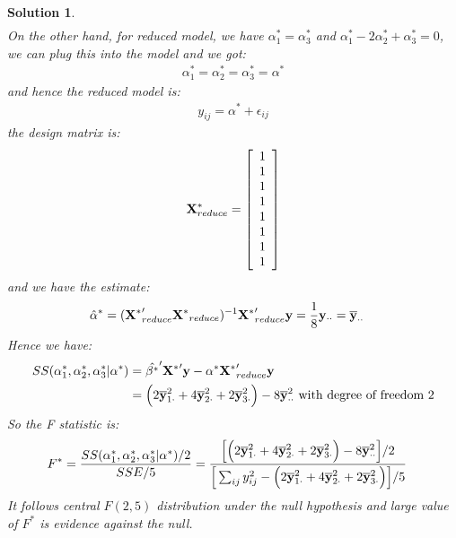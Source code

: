 \documentclass[11pt]{article}
\newtheorem{sol}{Solution}
\begin{document}
\begin{sol}
\begin{align*}
	\end{align*}
	On the other hand, for reduced model, we have $\alpha_1^{\ast} = \alpha_3^{\ast}$ and $\alpha_1^{\ast} - 2\alpha_2^{\ast} + \alpha_3^{\ast} = 0$, we can plug this into the model and we got:
	\begin{align*}
		\alpha_1^{\ast} = \alpha_2^{\ast} = \alpha_3^{\ast} = \alpha^{\ast}
	\end{align*}
	and hence the reduced model is:
	\begin{align*}
		y_{ij}  = \alpha^{\ast} + \epsilon_{ij}
	\end{align*}
	the design matrix is:
	\begin{align*}
		{\bf X}_{reduce}^{\ast} = \left[\begin{array}{c} 1\\ 1\\ 1\\ 1\\ 1\\ 1\\ 1\\ 1\end{array}\right]
	\end{align*}
	and we have the estimate:
	\begin{align*}
		\hat{\alpha}^{\ast} &= ({\bf X^{\ast}}_{reduce}'{\bf X^{\ast}}_{reduce})^{-1}{\bf X^{\ast}}_{reduce}'{\bf y} = \frac{1}{8}{\bf y}_{\cdot\cdot} = \overline{{\bf y}}_{\cdot\cdot}
	\end{align*}
	Hence we have:
	\begin{align*}
		SS(\alpha_1^{\ast}, \alpha_2^{\ast}, \alpha_3^{\ast}|\alpha^{\ast}) &= \hat{\beta^{\ast}}'{\bf X^{\ast}}'{\bf y}  - \alpha^{\ast}{\bf X^{\ast}}'_{reduce}{\bf y}\\
		&= \Big(2 \overline{{\bf y}}_{1\cdot}^2 + 4 \overline{{\bf y}}_{2\cdot}^2 + 2\overline{{\bf y}}_{3\cdot}^2\Big) - 8\overline{{\bf y}}_{\cdot\cdot}^2 \text{ with degree of freedom } 2
	\end{align*}
	So the F statistic is:
	\begin{align*}
		F^{\ast} &= \frac{SS(\alpha_1^{\ast}, \alpha_2^{\ast}, \alpha_3^{\ast}|\alpha^{\ast})/2}{SSE/5} = \frac{\Big[\Big(2 \overline{{\bf y}}_{1\cdot}^2 + 4 \overline{{\bf y}}_{2\cdot}^2 + 2\overline{{\bf y}}_{3\cdot}^2\Big) - 8\overline{{\bf y}}_{\cdot\cdot}^2\Big]/2}{\Big[\sum_{ij}y_{ij}^2 - \Big(2 \overline{{\bf y}}_{1\cdot}^2 + 4 \overline{{\bf y}}_{2\cdot}^2 + 2\overline{{\bf y}}_{3\cdot}^2\Big)\Big]/5}
	\end{align*}
	It follows central $F(2, 5)$ distribution under the null hypothesis and large value of $F^{\ast}$ is evidence against the null.\vskip 2mm

\end{sol}
\end{document}
